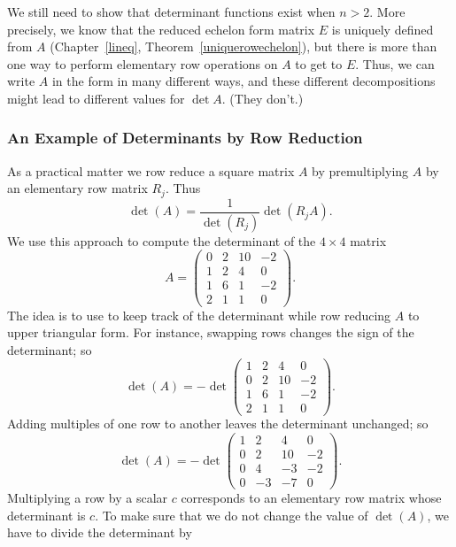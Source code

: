 We still need to show that determinant functions exist when $n>2$.  More 
precisely, we know that the reduced echelon form matrix $E$ is uniquely 
defined from $A$ (Chapter~\ref{lineq}, Theorem~\ref{uniquerowechelon}), but 
there is more than one way to perform elementary row operations on $A$ to 
get to $E$.  Thus, we can write $A$ in the form  in many 
different ways, and these different decompositions might lead to different 
values for $\det A$.  (They don't.)

\subsubsection*{An Example of Determinants by Row Reduction}

As a practical matter we row reduce a square matrix $A$ by 
premultiplying $A$ by an elementary row matrix $R_j$.  Thus 
\begin{equation} \label{e:pracdet}
\det(A) = \frac{1}{\det(R_j)} \det (R_j A).
\end{equation}
We use this approach to compute the determinant of the 
$4\times 4$ matrix 
\[
A = \left(\begin{array}{rrrr} 0 & 2 & 10 & -2 \\ 1 & 2 & 4 & 0\\
1 & 6 & 1 & -2 \\ 2 & 1 & 1 & 0 \end{array}\right).
\]
The idea is to use  to keep track of the 
determinant while row reducing $A$ to upper triangular form. 
For instance, swapping rows changes the sign of the determinant; 
so
\[
\det(A) = -\det\left(\begin{array}{rrrr} 1 & 2 & 4 & 0\\ 0 & 2 & 10 & -2 \\
1 & 6 & 1 & -2 \\ 2 & 1 & 1 & 0 \end{array}\right).
\]
Adding multiples of one row to another leaves the determinant
unchanged; so
\[
\det(A) = -\det\left(\begin{array}{rrrr} 1 & 2 & 4 & 0\\ 0 & 2 & 10 & -2 \\
0 & 4 & -3 & -2 \\ 0 & -3 & -7 & 0 \end{array}\right).
\]
Multiplying a row by a scalar $c$ corresponds to an elementary 
row matrix whose determinant is $c$.  To make sure that we do not 
change the value of $\det(A)$, we have to divide the determinant by 
